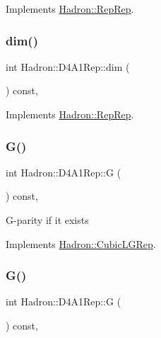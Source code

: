 Implements \mbox{\hyperlink{structHadron_1_1RepRep_a92c8802e5ed7afd7da43ccfd5b7cd92b}{Hadron\+::\+Rep\+Rep}}.

\mbox{\label{structHadron_1_1D4A1Rep_ae553df618a4dc5019fa2b0d1c43443b0}} 
\subsubsection{\texorpdfstring{dim()}{dim()}\hspace{0.1cm}{\footnotesize\ttfamily [3/3]}}
{\footnotesize\ttfamily int Hadron\+::\+D4\+A1\+Rep\+::dim (\begin{DoxyParamCaption}{ }\end{DoxyParamCaption}) const\hspace{0.3cm}{\ttfamily [inline]}, {\ttfamily [virtual]}}



Implements \mbox{\hyperlink{structHadron_1_1RepRep_a92c8802e5ed7afd7da43ccfd5b7cd92b}{Hadron\+::\+Rep\+Rep}}.

\mbox{\label{structHadron_1_1D4A1Rep_a4224f0d47cc0a894a9da4c8505d51c29}} 
\subsubsection{\texorpdfstring{G()}{G()}\hspace{0.1cm}{\footnotesize\ttfamily [1/2]}}
{\footnotesize\ttfamily int Hadron\+::\+D4\+A1\+Rep\+::G (\begin{DoxyParamCaption}{ }\end{DoxyParamCaption}) const\hspace{0.3cm}{\ttfamily [inline]}, {\ttfamily [virtual]}}

G-\/parity if it exists 

Implements \mbox{\hyperlink{structHadron_1_1CubicLGRep_ace26f7b2d55e3a668a14cb9026da5231}{Hadron\+::\+Cubic\+L\+G\+Rep}}.

\mbox{\label{structHadron_1_1D4A1Rep_a4224f0d47cc0a894a9da4c8505d51c29}} 
\subsubsection{\texorpdfstring{G()}{G()}\hspace{0.1cm}{\footnotesize\ttfamily [2/2]}}
{\footnotesize\ttfamily int Hadron\+::\+D4\+A1\+Rep\+::G (\begin{DoxyParamCaption}{ }\end{DoxyParamCaption}) const\hspace{0.3cm}{\ttfamily [inline]}, {\ttfamily [virtual]}}

